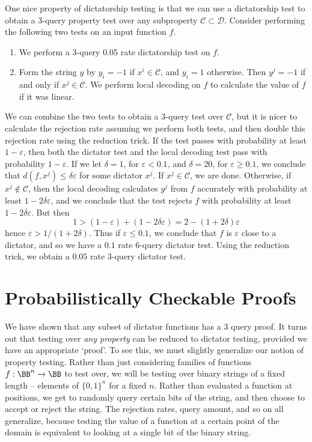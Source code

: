 One nice property of dictatorship testing is that we can use a dictatorship test to obtain a 3-query property test over any subproperty $\mathcal{C} \subset \mathcal{D}$. Consider performing the following two tests on an input function $f$.
%
\begin{enumerate}
    \item We perform a 3-query 0.05 rate dictatorship test on $f$.
    \item Form the string $y$ by $y_i = -1$ if $x^i \in \mathcal{C}$, and $y_i = 1$ otherwise. Then $y^j = -1$ if and only if $x^j \in \mathcal{C}$. We perform local decoding on $f$ to calculate the value of $f$ if it was linear.
\end{enumerate}
%
We can combine the two tests to obtain a 3-query test over $\mathcal{C}$, but it is nicer to calculate the rejection rate assuming we perform both tests, and then double this rejection rate using the reduction trick. If the test passes with probability at least $1 - \varepsilon$, then both the dictator test and the local decoding test pass with probability $1 - \varepsilon$. If we let $\delta = 1$, for $\varepsilon < 0.1$, and $\delta = 20$, for $\varepsilon \geq 0.1$, we conclude that $d(f,x^j) \leq \delta \varepsilon$ for some dictator $x^j$. If $x^j \in \mathcal{C}$, we are done. Otherwise, if $x^j \not \in \mathcal{C}$, then the local decoding calculates $y^j$ from $f$ accurately with probability at least $1 - 2 \delta \varepsilon$, and we conclude that the test rejects $f$ with probability at least $1 - 2 \delta \varepsilon$. But then
%
\[ 1 > (1 - \varepsilon) + (1 - 2 \delta \varepsilon) = 2 - (1 + 2 \delta) \varepsilon \]
%
hence $\varepsilon > 1/(1 + 2 \delta)$. Thus if $\varepsilon \leq 0.1$, we conclude that $f$ is $\varepsilon$ close to a dictator, and so we have a $0.1$ rate 6-query dictator test. Using the reduction trick, we obtain a $0.05$ rate 3-query dictator test.

\section{Probabilistically Checkable Proofs}

We have shown that any subset of dictator functions has a 3 query proof. It turns out that testing over {\it any property} can be reduced to dictator testing, provided we have an appropriate `proof'. To see this, we must slightly generalize our notion of property testing. Rather than just considering families of functions $f: \BB^n \to \BB$ to test over, we will be testing over binary strings of a fixed length -- elements of $\{ 0, 1 \}^n$ for a fixed $n$. Rather than evaluated a function at positions, we get to randomly query certain bits of the string, and then choose to accept or reject the string. The rejection rates, query amount, and so on all generalize, because testing the value of a function at a certain point of the domain is equivalent to looking at a single bit of the binary string.

